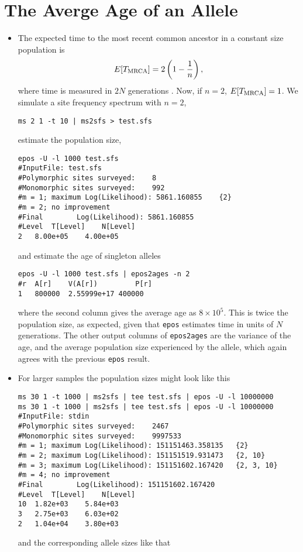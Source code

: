 \documentclass[a4paper]{article}
\newcommand{\ty}{\texttt}
\begin{document}
\section{The Averge Age of an Allele}
\begin{itemize}
  \item The expected
    time to the most recent common
    ancestor in a constant size population is
    \[
    E[T_{\rm MRCA}]=2\left(1-\frac{1}{n}\right),
    \]
    where time is measured in $2N$
    generations  \citep[p.76]{wak09:coa}. Now, if $n=2$, $E[T_{\rm
        MRCA}]=1$. We simulate a site frequency spectrum with $n=2$,
\begin{verbatim}
ms 2 1 -t 10 | ms2sfs > test.sfs
\end{verbatim}
estimate the population size,
\begin{verbatim}
epos -U -l 1000 test.sfs
#InputFile:	test.sfs
#Polymorphic sites surveyed:	8
#Monomorphic sites surveyed:	992
#m = 1; maximum Log(Likelihood): 5861.160855	{2}
#m = 2; no improvement
#Final        Log(Likelihood): 5861.160855
#Level	T[Level]	N[Level]
2	8.00e+05	4.00e+05
\end{verbatim}
and estimate the age of singleton alleles
\begin{verbatim}
epos -U -l 1000 test.sfs | epos2ages -n 2
#r	A[r]	V(A[r])	        P[r]
1	800000	2.55999e+17	400000
\end{verbatim}
where the second column gives the average age as $8\times 10^5$. This
is twice the population size, as expected, given that \ty{epos}
estimates time in units of $N$ generations. The other output columns
of \ty{epos2ages} are the variance of the age, and the average
population size experienced by the allele, which again agrees with the
previous \ty{epos} result.
\item For larger samples the population sizes might look like this
\begin{verbatim}
ms 30 1 -t 1000 | ms2sfs | tee test.sfs | epos -U -l 10000000 
ms 30 1 -t 1000 | ms2sfs | tee test.sfs | epos -U -l 10000000 
#InputFile:	stdin
#Polymorphic sites surveyed:	2467
#Monomorphic sites surveyed:	9997533
#m = 1; maximum Log(Likelihood): 151151463.358135	{2}
#m = 2; maximum Log(Likelihood): 151151519.931473	{2, 10}
#m = 3; maximum Log(Likelihood): 151151602.167420	{2, 3, 10}
#m = 4; no improvement
#Final        Log(Likelihood): 151151602.167420
#Level	T[Level]	N[Level]
10	1.82e+03	5.84e+03
3	2.75e+03	6.03e+02
2	1.04e+04	3.80e+03
\end{verbatim}
and the corresponding allele sizes like that

\end{itemize}
\end{document}
